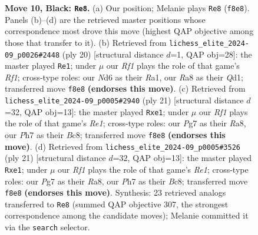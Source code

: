 \documentclass[11pt]{article}
\begin{document}
\begin{figure}[p]
\caption{\textbf{Move 10, Black: \texttt{Re8}.} (a) Our position; Melanie plays \texttt{Re8} (\texttt{f8e8}). Panels (b)--(d) are the retrieved master positions whose correspondence most drove this move (highest QAP objective among those that transfer to it). (b) Retrieved from \texttt{lichess\_elite\_2024-09\_p0026\#2448} (ply 20) [structural distance $d$=1, QAP obj=28]: the master played \texttt{Re1}; under $\mu$ our \emph{Rf1} plays the role of that game's \emph{Rf1}; cross-type roles: our \emph{N}d6 as their \emph{R}a1, our \emph{R}a8 as their \emph{Q}d1; transferred move \texttt{f8e8} \textbf{(endorses this move)}. (c) Retrieved from \texttt{lichess\_elite\_2024-09\_p0005\#2940} (ply 21) [structural distance $d$=32, QAP obj=13]: the master played \texttt{Rxe1}; under $\mu$ our \emph{Rf1} plays the role of that game's \emph{Re1}; cross-type roles: our \emph{P}g7 as their \emph{R}a8, our \emph{P}h7 as their \emph{B}c8; transferred move \texttt{f8e8} \textbf{(endorses this move)}. (d) Retrieved from \texttt{lichess\_elite\_2024-09\_p0005\#3526} (ply 21) [structural distance $d$=32, QAP obj=13]: the master played \texttt{Rxe1}; under $\mu$ our \emph{Rf1} plays the role of that game's \emph{Re1}; cross-type roles: our \emph{P}g7 as their \emph{R}a8, our \emph{P}h7 as their \emph{B}c8; transferred move \texttt{f8e8} \textbf{(endorses this move)}. Synthesis: 23 retrieved analogs transferred to \texttt{Re8} (summed QAP objective 307, the strongest correspondence among the candidate moves); Melanie committed it via the \texttt{search} selector.}
\label{fig:thought-m19}
\end{figure}

\clearpage
\end{document}

